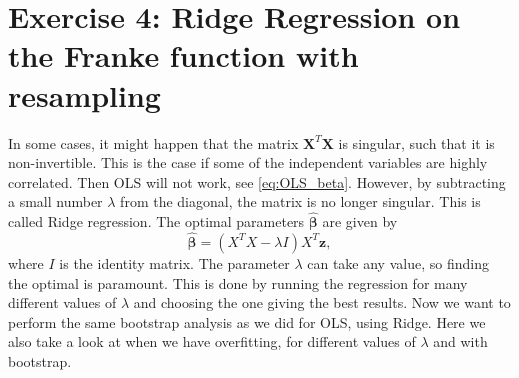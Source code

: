 \documentclass[reprint,english,notitlepage,aps,nobalancelastpage,nofootinbib]{revtex4-1}  %
\newcommand{\vc}[1]{\mathbf{#1}}
\begin{document}
\section*{Exercise 4: Ridge Regression on the Franke function with resampling}
In some cases, it might happen that the matrix $\mathbf{X}^T\mathbf{X}$ is singular, such that it is non-invertible. This is the case if some of the independent variables are highly correlated. Then OLS will not work, see \eqref{eq:OLS_beta}. However, by subtracting a small number $\lambda$ from the diagonal, the matrix is no longer singular. This is called Ridge regression. The optimal parameters $\boldsymbol{\hat\beta}$ are given by
\begin{equation}
	\boldsymbol{\hat{\beta}} = (X^TX-\lambda I)X^T\vc{z},
\end{equation}
where $I$ is  the identity matrix. The parameter $\lambda$ can take any value, so finding the optimal is paramount. This is done by running the regression for many different values of $\lambda$ and choosing the one giving the best results. Now we want to perform the same bootstrap analysis as we did for OLS, using Ridge. Here we also take a look at when we have overfitting, for different values of $\lambda$ and with bootstrap.
\end{document}
